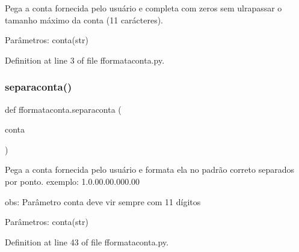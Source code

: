 \begin{DoxyVerb}Pega a conta fornecida pelo usuário e completa com zeros sem ulrapassar o tamanho
máximo da conta (11 carácteres).

Parâmetros:
conta(str)
\end{DoxyVerb}
 

Definition at line 3 of file fformataconta.\+py.

\mbox{\label{namespacefformataconta_ae46830764e3f3a431a5e3de1d14361bf}} 
\subsubsection{separaconta()}
{\footnotesize\ttfamily def fformataconta.\+separaconta (\begin{DoxyParamCaption}\item[{}]{conta }\end{DoxyParamCaption})}

\begin{DoxyVerb}Pega a conta fornecida pelo usuário e formata ela no padrão correto separados por ponto.
exemplo:
1.0.00.00.000.00

obs: Parâmetro conta deve vir sempre com 11 dígitos

Parâmetros:
conta(str)\end{DoxyVerb}
 

Definition at line 43 of file fformataconta.\+py.

